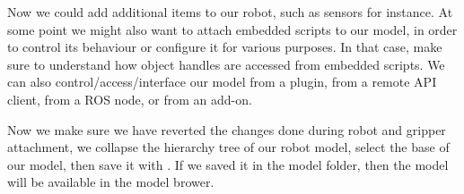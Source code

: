 
Now we could add additional items to our robot, such as sensors for instance. 
At some point we might also want to attach embedded scripts to our model, in 
order to control its behaviour or configure it for various purposes. In that 
case, make sure to understand how object handles are accessed from embedded 
scripts. We can also control/access/interface our model from a plugin, from 
a remote API client, from a ROS node, or from an add-on.

Now we make sure we have reverted the changes done during robot and gripper 
attachment, we collapse the hierarchy tree of our robot model, select the 
base of our model, then save it with . 
If we saved it in the model folder, then the model will be available 
in the model brower.
